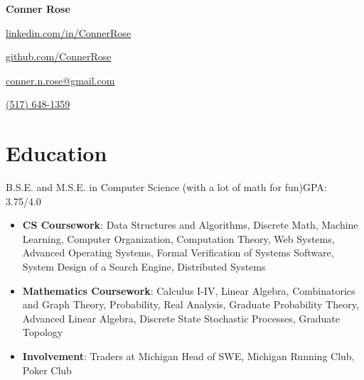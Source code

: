 \documentclass[letterpaper,11pt]{article}
\begin{document}
\begin{center}
  \huge{\textbf{Conner Rose}} \\
  \begin{itemize*}
    \item[] \href{https://linkedin.com/in/ConnerRose}{linkedin.com/in/ConnerRose}
    \item \href{https://github.com/ConnerRose}{github.com/ConnerRose}
    \item \href{mailto:conner.n.rose@gmail.com}{conner.n.rose@gmail.com}
    \item \href{tel:+15176481359}{(517) 648-1359}
  \end{itemize*}
\end{center}

\section{Education}
{B.S.E. and M.S.E. in Computer Science (with a lot of math for fun)}{GPA: 3.75/4.0}
\begin{itemize}
  \item \textbf{CS Coursework}: Data Structures and Algorithms, Discrete Math,
        Machine Learning, Computer Organization, Computation Theory,
        Web Systems, Advanced Operating Systems, Formal Verification of Systems
        Software, \\
        System Design of a Search Engine, Distributed Systems
  \item \textbf{Mathematics Coursework}: Calculus I-IV, Linear Algebra,
        Combinatorics and Graph Theory, Probability, Real Analysis, Graduate
        Probability Theory, Advanced Linear Algebra, Discrete State Stochastic
        Processes, Graduate Topology
  \item \textbf{Involvement}: Traders at Michigan Head of SWE, Michigan Running Club, Poker Club
\end{itemize}
\end{document}

